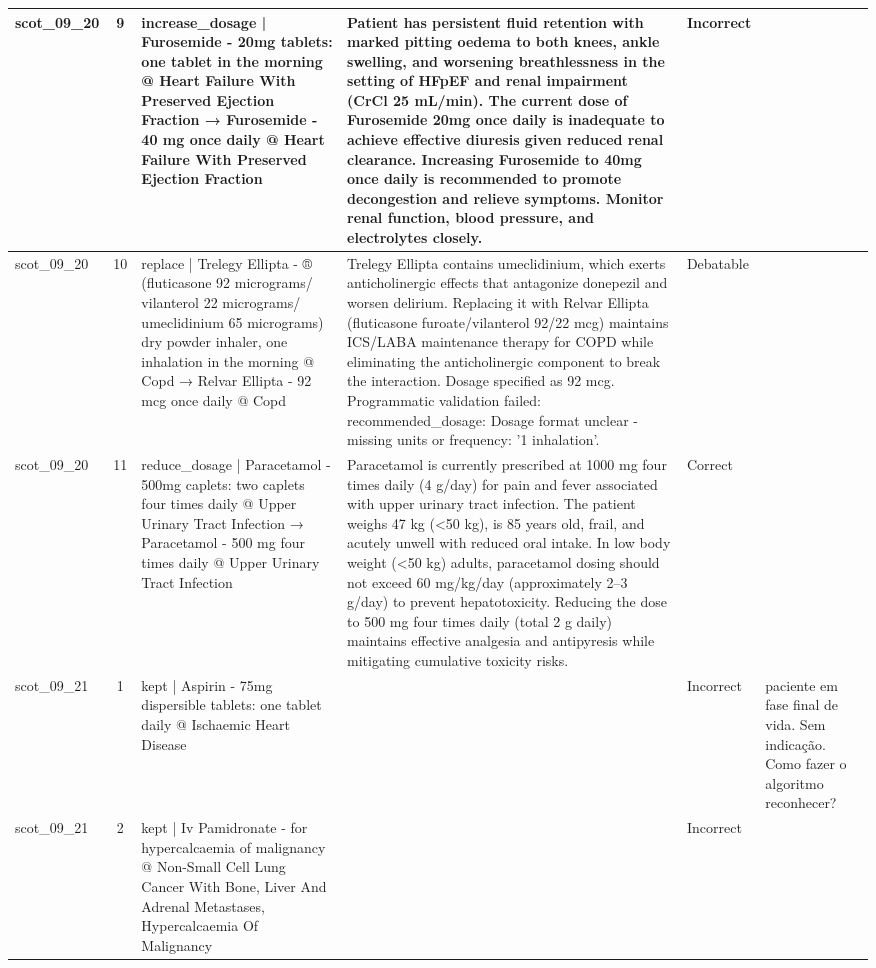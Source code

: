 \begin{longtable}{|p{1.45cm}|c|p{3.3cm}|p{6.5cm}|p{1.55cm}|p{2.3cm}|}
scot\_09\_20 & 9 & increase\_dosage | Furosemide - 20mg tablets: one tablet in the morning @ Heart Failure With Preserved Ejection Fraction → Furosemide - 40 mg once daily @ Heart Failure With Preserved Ejection Fraction & Patient has persistent fluid retention with marked pitting oedema to both knees, ankle swelling, and worsening breathlessness in the setting of HFpEF and renal impairment (CrCl 25 mL/min). The current dose of Furosemide 20mg once daily is inadequate to achieve effective diuresis given reduced renal clearance. Increasing Furosemide to 40mg once daily is recommended to promote decongestion and relieve symptoms. Monitor renal function, blood pressure, and electrolytes closely. & Incorrect &  \\
\hline
scot\_09\_20 & 10 & replace | Trelegy Ellipta - ® (fluticasone 92 micrograms/ vilanterol 22 micrograms/ umeclidinium 65 micrograms) dry powder inhaler, one inhalation in the morning @ Copd → Relvar Ellipta - 92 mcg once daily @ Copd & Trelegy Ellipta contains umeclidinium, which exerts anticholinergic effects that antagonize donepezil and worsen delirium. Replacing it with Relvar Ellipta (fluticasone furoate/vilanterol 92/22 mcg) maintains ICS/LABA maintenance therapy for COPD while eliminating the anticholinergic component to break the interaction. Dosage specified as 92 mcg. Programmatic validation failed: recommended\_dosage: Dosage format unclear - missing units or frequency: '1 inhalation'. & Debatable &  \\
\hline
scot\_09\_20 & 11 & reduce\_dosage | Paracetamol - 500mg caplets: two caplets four times daily @ Upper Urinary Tract Infection → Paracetamol - 500 mg four times daily @ Upper Urinary Tract Infection & Paracetamol is currently prescribed at 1000 mg four times daily (4 g/day) for pain and fever associated with upper urinary tract infection. The patient weighs 47 kg (<50 kg), is 85 years old, frail, and acutely unwell with reduced oral intake. In low body weight (<50 kg) adults, paracetamol dosing should not exceed 60 mg/kg/day (approximately 2–3 g/day) to prevent hepatotoxicity. Reducing the dose to 500 mg four times daily (total 2 g daily) maintains effective analgesia and antipyresis while mitigating cumulative toxicity risks. & Correct &  \\
\hline
scot\_09\_21 & 1 & kept | Aspirin - 75mg dispersible tablets: one tablet daily @ Ischaemic Heart Disease &  & Incorrect & paciente em fase final de vida. Sem indicação. Como fazer o algoritmo reconhecer? \\
\hline
scot\_09\_21 & 2 & kept | Iv Pamidronate - for hypercalcaemia of malignancy @ Non-Small Cell Lung Cancer With Bone, Liver And Adrenal Metastases, Hypercalcaemia Of Malignancy &  & Incorrect &  \\

\end{longtable}
